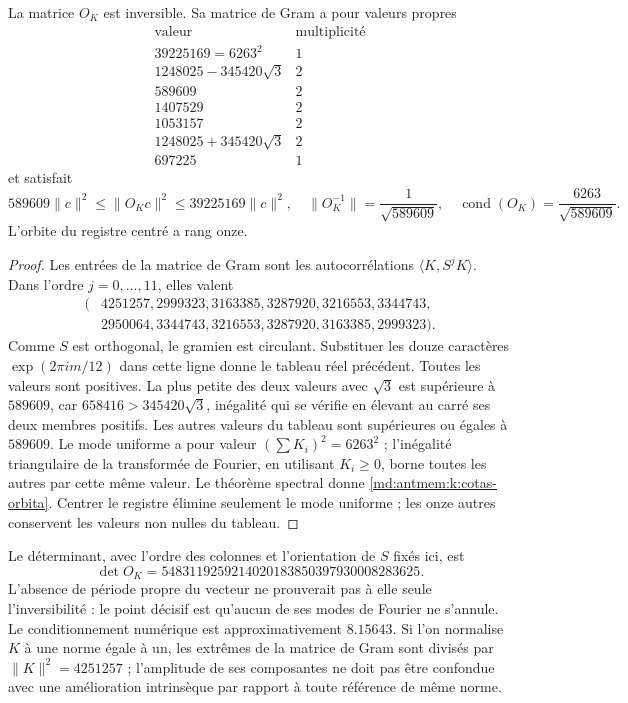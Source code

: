 \begin{theorem}
\label{md:antmem:k:marco-ciclico}
La matrice \(O_K\) est inversible. Sa matrice de Gram a pour valeurs propres
\[
\begin{array}{c|c}
 \text{valeur}&\text{multiplicité}\\\hline
 39225169=6263^2&1\\
 1248025-345420\sqrt3&2\\
 589609&2\\
 1407529&2\\
 1053157&2\\
 1248025+345420\sqrt3&2\\
 697225&1
\end{array}
\]
et satisfait
\begin{equation}
 589609\|c\|^2\leq\|O_Kc\|^2\leq39225169\|c\|^2,
 \quad
 \|O_K^{-1}\|=\frac1{\sqrt{589609}},\quad
 \operatorname{cond}(O_K)=\frac{6263}{\sqrt{589609}}.
 \label{md:antmem:k:cotas-orbita}
\end{equation}
L’orbite du registre centré a rang onze.
\end{theorem}
\begin{proof}
Les entrées de la matrice de Gram sont les autocorrélations \(\langle K,S^jK\rangle\). Dans l'ordre \(j=0,\ldots,11\), elles valent
\begin{align*}
 (&4251257,2999323,3163385,3287920,3216553,3344743,\\
  &2950064,3344743,3216553,3287920,3163385,2999323).
\end{align*}
Comme \(S\) est orthogonal, le gramien est circulant. Substituer les douze
caractères \(\exp(2\pi i m/12)\) dans cette ligne donne le tableau réel
précédent. Toutes les valeurs sont positives. La plus petite des deux valeurs
avec \(\sqrt3\) est supérieure à \(589609\), car
\(658416>345420\sqrt3\), inégalité qui se vérifie en élevant au
carré ses deux membres positifs. Les autres valeurs du tableau sont
supérieures ou égales à \(589609\). Le mode uniforme a pour valeur
\((\sum K_i)^2=6263^2\) ; l’inégalité triangulaire de la transformée
de Fourier, en utilisant \(K_i\geq0\), borne toutes les autres par cette même
valeur. Le théorème spectral donne \eqref{md:antmem:k:cotas-orbita}. Centrer
le registre élimine seulement le mode uniforme ; les onze autres conservent
les valeurs non nulles du tableau.
\end{proof}

Le déterminant, avec l’ordre des colonnes et l’orientation de \(S\)
fixés ici, est
\[
 \det O_K=5483119259214020183850397930008283625.
\]
L'absence de période propre du vecteur ne prouverait pas à elle seule l'inversibilité : le point décisif est qu'aucun de ses modes de Fourier ne s'annule. Le conditionnement numérique est approximativement \(8.15643\). Si l'on normalise \(K\) à une norme égale à un, les extrêmes de la matrice de Gram sont divisés par \(\|K\|^2=4251257\) ; l'amplitude de ses composantes ne doit pas être confondue avec une amélioration intrinsèque par rapport à toute référence de même norme.

